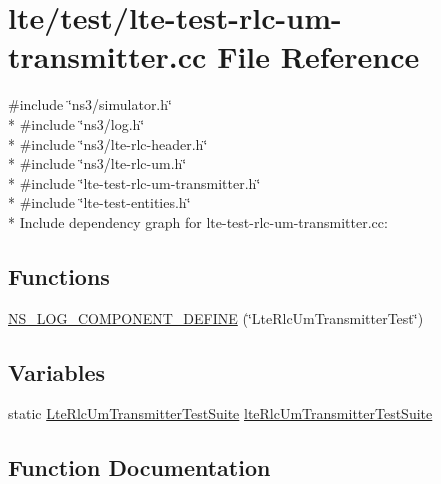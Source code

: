 \hypertarget{lte-test-rlc-um-transmitter_8cc}{}\section{lte/test/lte-\/test-\/rlc-\/um-\/transmitter.cc File Reference}
\label{lte-test-rlc-um-transmitter_8cc}
{\ttfamily \#include \char`\"{}ns3/simulator.\+h\char`\"{}}\\*
{\ttfamily \#include \char`\"{}ns3/log.\+h\char`\"{}}\\*
{\ttfamily \#include \char`\"{}ns3/lte-\/rlc-\/header.\+h\char`\"{}}\\*
{\ttfamily \#include \char`\"{}ns3/lte-\/rlc-\/um.\+h\char`\"{}}\\*
{\ttfamily \#include \char`\"{}lte-\/test-\/rlc-\/um-\/transmitter.\+h\char`\"{}}\\*
{\ttfamily \#include \char`\"{}lte-\/test-\/entities.\+h\char`\"{}}\\*
Include dependency graph for lte-\/test-\/rlc-\/um-\/transmitter.cc\+:
\subsection*{Functions}
\begin{DoxyCompactItemize}
\item 
\hyperlink{lte-test-rlc-um-transmitter_8cc_a445806503d681fec03a10c1bd634aba4}{N\+S\+\_\+\+L\+O\+G\+\_\+\+C\+O\+M\+P\+O\+N\+E\+N\+T\+\_\+\+D\+E\+F\+I\+NE} (\char`\"{}Lte\+Rlc\+Um\+Transmitter\+Test\char`\"{})
\end{DoxyCompactItemize}
\subsection*{Variables}
\begin{DoxyCompactItemize}
\item 
static \hyperlink{classLteRlcUmTransmitterTestSuite}{Lte\+Rlc\+Um\+Transmitter\+Test\+Suite} \hyperlink{lte-test-rlc-um-transmitter_8cc_ab0837adfc7d6487ed99ee8fba5df595c}{lte\+Rlc\+Um\+Transmitter\+Test\+Suite}
\end{DoxyCompactItemize}


\subsection{Function Documentation}
